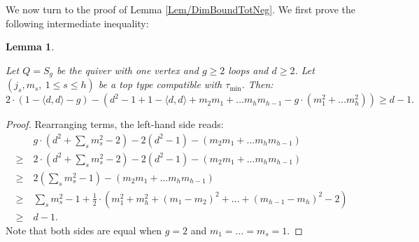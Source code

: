 \documentclass[11pt,english]{article}
\numberwithin{equation}{section}
\numberwithin{figure}{section}
\theoremstyle{definition}
\theoremstyle{plain}
\newtheorem{lem}[df]{Lemma}
\theoremstyle{remark}
\begin{document}
We now turn to the proof of Lemma \ref{Lem/DimBoundTotNeg}. We first
prove the following intermediate inequality:

\begin{lem} \label{Lem/DimBoundLoops}

Let $Q=S_{g}$ be the quiver with one vertex and $g\geq2$ loops and
$d\geq2$. Let $(j_{s},m_{s},\ 1\leq s\leq h)$ be a top type compatible
with $\tau_{\min}$. Then:\[
2\cdot(1-\langle d,d\rangle-g)-\left(d^2-1+1-\langle d,d\rangle+m_{2}m_{1}+\ldots m_{h}m_{h-1}-g\cdot(m_{1}^2+\ldots m_{h}^2)\right)\geq d-1.
\]\end{lem}

\begin{proof}

Rearranging terms, the left-hand side reads:\[
\begin{split}
& g\cdot\left(d^2+\sum_sm_s^2-2\right)-2(d^2-1)-(m_{2}m_{1}+\ldots m_{h}m_{h-1}) \\
\geq\ & 2\cdot\left(d^2+\sum_sm_s^2-2\right)-2(d^2-1)-(m_{2}m_{1}+\ldots m_{h}m_{h-1}) \\
\geq\ & 2\left(\sum_sm_s^2-1\right)-(m_{2}m_{1}+\ldots m_{h}m_{h-1}) \\
\geq\ &\sum_sm_s^2-1+\frac{1}{2}\cdot\left(m_1^2+m_h^2+(m_1-m_2)^2+\ldots+(m_{h-1}-m_h)^2-2\right) \\
\geq\ & d-1.
\end{split}
\]Note that both sides are equal when $g=2$ and $m_{1}=\ldots=m_{s}=1$.
\end{proof}
\end{document}
